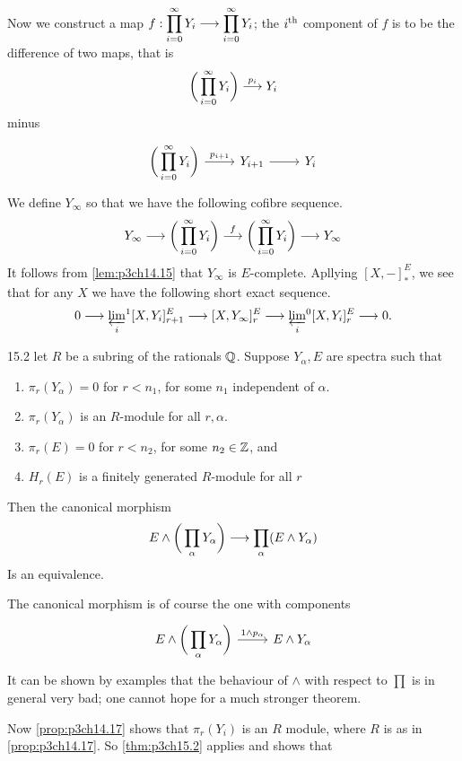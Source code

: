\documentclass[../main]{subfiles}
\begin{document}
Now we construct a map $\displaystyle f:\prod_{i=0}^\infty Y_i\lar{}\prod_{i=0}^\infty Y_i$; the $i^{\text{th}}$ component of $f$ is to be the difference of two maps, that is \[\bigg( \prod_{i=0}^\infty Y_i\bigg)\lar{p_i} Y_i\]
minus 
\[
\begin{tikzcd}
\displaystyle\bigg(\prod_{i=0}^\infty Y_i\bigg)\arrow[r,"p_{i+1}"] &Y_{i+1} \arrow[r] &Y_i
\end{tikzcd}
\]
We define $Y_\infty$ so that we have the following cofibre sequence.
\[Y_\infty\lar{}\bigg(\prod_{i=0}^\infty Y_i\bigg)\lar{f} \bigg(\prod_{i=0}^\infty Y_i\bigg)\lar{} Y_\infty  \]
It follows from \ref{lem:p3ch14.15} that $Y_\infty$ is $E$-complete. Apllying $[X,-]^E_\ast$, we see that for any $X$ we have the following short exact sequence.
\[0\lar{} \varprojlim_i\!^1[X,Y_i]^E_{r+1}\lar{}[X,Y_\infty]^E_r\lar{}\varprojlim_i\!^0[X,Y_i]^E_r\lar{}0.\]

\begin{customthm}{15.2}\label{thm:p3ch15.2}
let $R$ be a subring of the rationals $\mathbb{Q}$. Suppose $Y_\alpha,E$ are spectra such that 
\begin{enumerate}
    \item[(i)] $\pi_r(Y_\alpha)=0$ for $r<n_1$, for some $n_1$ independent of $\alpha$.
    \item[(ii)] $\pi_r(Y_\alpha)$ is an $R$-module for all $r,\alpha$.
    \item[(iii)] $\pi_r(E)=0$ for $r<n_2$, for some $n_2\in \mathbb{Z}$, and
    \item[(iv)] $H_r(E)$ is a finitely generated $R$-module for all $r$
\end{enumerate}
Then the canonical morphism
\[E\wedge\bigg(\prod_\alpha Y_\alpha \bigg)\lar{}\prod_\alpha (E\wedge Y_\alpha) \]
Is an equivalence.
\end{customthm}
The canonical morphism is of course the one with components 
\[
\begin{tikzcd}
E\wedge\bigg(\displaystyle\prod_\alpha Y_\alpha \bigg)\arrow[r,"1\wedge p_\alpha"]& E\wedge Y_\alpha\end{tikzcd} 
\]
It can be shown by examples that the behaviour of $\wedge$  with respect to $\displaystyle \prod$ is in general very bad; one cannot hope for a much stronger theorem.

Now \ref{prop:p3ch14.17} shows that $\pi_r(Y_i)$ is an $R$ module, where $R$ is as in \ref{prop:p3ch14.17}. So \ref{thm:p3ch15.2} applies and shows that 
\end{document}
